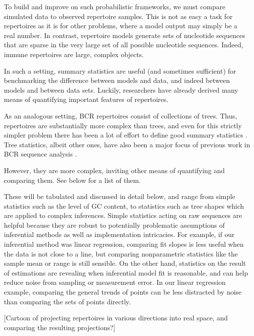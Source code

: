 \documentclass{article}
\begin{document}
To build and improve on such probabilistic frameworks, we must compare simulated data to observed repertoire samples.
This is not as easy a task for repertoires as it is for other problems, where a model output may simply be a real number.
In contrast, repertoire models generate sets of nucleotide sequences that are sparse in the very large set of all possible nucleotide sequences.
Indeed, immune repertoires are large, complex objects.

In such a setting, summary statistics are useful (and sometimes sufficient) for benchmarking the difference between models and data, and indeed between models and between data sets.
Luckily, researchers have already derived many means of quantifying important features of repertoires.

As an analogous setting, BCR repertoires consist of collections of trees.
Thus, repertoires are substantially more complex than trees, and even for this strictly simpler problem there has been a lot of effort to define good summary statistics \cite{Mooers1997-jl}.
Tree statistics, albeit other ones, have also been a major focus of previous work in BCR sequence analysis \cite{Dunn-Walters2004-hv,Mehr2004-ej,Steiman-Shimony2006-fm,Shahaf2008-cc}.

However, they are more complex, inviting other means of quantifying and comparing them.
See below for a list of them.



These will be tabulated and discussed in detail below, and range from simple statistics such as the level of GC content, to statistics such as tree shapes which are applied to complex inferences.
Simple statistics acting on raw sequences are helpful because they are robust to potentially problematic assumptions of inferential methods as well as implementation intricacies.
For example, if our inferential method was linear regression, comparing fit slopes is less useful when the data is not close to a line, but comparing nonparametric statistics like the sample mean or range is still sensible.
On the other hand, statistics on the result of estimations are revealing when inferential model fit is reasonable, and can help reduce noise from sampling or measurement error.
In our linear regression example, comparing the general trends of points can be less distracted by noise than comparing the sets of points directly.

[Cartoon of projecting repertoires in various directions into real space, and comparing the resulting projections?]
\end{document}
